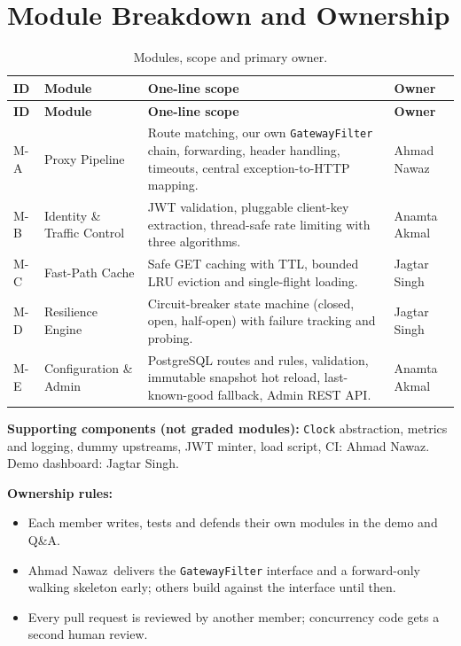 \documentclass[12pt,a4paper]{article}
\newcommand{\cls}[1]{\nolinkurl{#1}}
\newcommand{\ma}{Ahmad Nawaz}
\newcommand{\mb}{Anamta Akmal}
\newcommand{\mc}{Jagtar Singh}
\begin{document}
\section{Module Breakdown and Ownership}
\label{sec:modules}
\begingroup
\small
\setlength{\tabcolsep}{4pt}
\begin{longtable}{L{1.0cm} L{3.6cm} L{7.4cm} L{2.2cm}}
\caption{Modules, scope and primary owner.}\\
\toprule
\textbf{ID} & \textbf{Module} & \textbf{One-line scope} & \textbf{Owner} \\
\midrule
\endfirsthead
\toprule
\textbf{ID} & \textbf{Module} & \textbf{One-line scope} & \textbf{Owner} \\
\midrule
\endhead
M-A & Proxy Pipeline & Route matching, our own \cls{GatewayFilter} chain, forwarding, header handling, timeouts, central exception-to-HTTP mapping. & \ma \\
M-B & Identity \& Traffic Control & JWT validation, pluggable client-key extraction, thread-safe rate limiting with three algorithms. & \mb \\
M-C & Fast-Path Cache & Safe GET caching with TTL, bounded LRU eviction and single-flight loading. & \mc \\
M-D & Resilience Engine & Circuit-breaker state machine (closed, open, half-open) with failure tracking and probing. & \mc \\
M-E & Configuration \& Admin & PostgreSQL routes and rules, validation, immutable snapshot hot reload, last-known-good fallback, Admin REST API. & \mb \\
\bottomrule
\end{longtable}
\endgroup

\textbf{Supporting components (not graded modules):} \cls{Clock} abstraction, metrics and logging, dummy upstreams, JWT minter, load script, CI: \ma. Demo dashboard: \mc.

\textbf{Ownership rules:}
\begin{itemize}[noitemsep]
    \item Each member writes, tests and defends their own modules in the demo and Q\&A.
    \item \ma\ delivers the \cls{GatewayFilter} interface and a forward-only walking skeleton early; others build against the interface until then.
    \item Every pull request is reviewed by another member; concurrency code gets a second human review.
\end{itemize}
\end{document}
